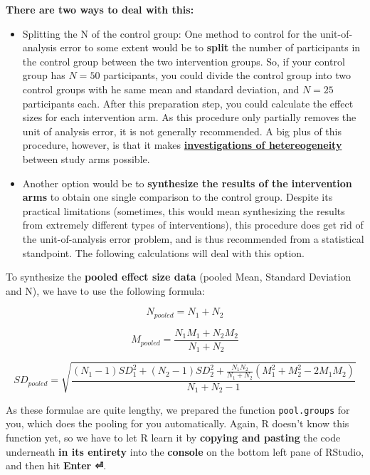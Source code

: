 \documentclass[]{book}
\providecommand{\tightlist}{%
  \setlength{\itemsep}{0pt}\setlength{\parskip}{0pt}}
\theoremstyle{definition}
\theoremstyle{definition}
\theoremstyle{definition}
\theoremstyle{remark}
\begin{document}
\textbf{There are two ways to deal with this:}

\begin{itemize}
\tightlist
\item
  Splitting the N of the control group: One method to control for the
  unit-of-analysis error to some extent would be to \textbf{split} the
  number of participants in the control group between the two
  intervention groups. So, if your control group has \(N=50\)
  participants, you could divide the control group into two control
  groups with he same mean and standard deviation, and \(N=25\)
  participants each. After this preparation step, you could calculate
  the effect sizes for each intervention arm. As this procedure only
  partially removes the unit of analysis error, it is not generally
  recommended. A big plus of this procedure, however, is that it makes
  \protect\hyperlink{heterogeneity}{\textbf{investigations of
  hetereogeneity}} between study arms possible.
\item
  Another option would be to \textbf{synthesize the results of the
  intervention arms} to obtain one single comparison to the control
  group. Despite its practical limitations (sometimes, this would mean
  synthesizing the results from extremely different types of
  interventions), this procedure does get rid of the unit-of-analysis
  error problem, and is thus recommended from a statistical standpoint.
  The following calculations will deal with this option.
\end{itemize}

To synthesize the \textbf{pooled effect size data} (pooled Mean,
Standard Deviation and N), we have to use the following formula:

\[N_{pooled}=N_1+N_2\]

\[M_{pooled}=\frac{N_1M_1+N_2M_2}{N_1+N_2}\]

\[SD_{pooled} = \sqrt{\frac{(N_1-1)SD^{2}_{1}+ (N_2-1)SD^{2}_{2}+\frac{N_1N_2}{N_1+N_2}(M^{2}_1+M^{2}_2-2M_1M_2)} {N_1+N_2-1}}\]

As these formulae are quite lengthy, we prepared the function
\texttt{pool.groups} for you, which does the pooling for you
automatically. Again, R doesn't know this function yet, so we have to
let R learn it by \textbf{copying and pasting} the code underneath
\textbf{in its entirety} into the \textbf{console} on the bottom left
pane of RStudio, and then hit \textbf{Enter ⏎}.
\end{document}
